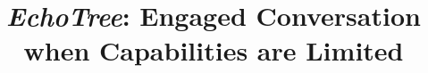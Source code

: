 \documentclass{sigchi}
\begin{document}
\title{{\em EchoTree}: Engaged Conversation when Capabilities are Limited}






\maketitle
\end{document}

